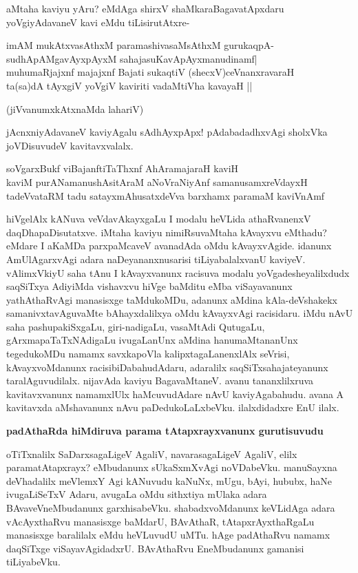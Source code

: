 \noindent
aMtaha kaviyu yAru? eMdAga shirxV shaMkaraBagavatApxdaru yoVgiyAdavaneV kavi eMdu tiLi\-sirutAtxre-

\begin{shloka}
imAM mukAtxvasAthxM paramashivasaMsAthxM gurukaqpA-\\\label{239}
sudhApAMgavAyxpAyxM sahajasuKavApAyxmanudinamf|\\
muhumaRjajxnf majajxnf Bajati sukaqtiV (shecxV)ceVnanxravaraH\\
ta(sa)dA tAyxgiV yoVgiV kaviriti vadaMtiVha kavayaH ||

\hfill{(jiVvanumxkAtxnaMda lahariV)}
\end{shloka}

\noindent
jAcnxniyAdavaneV kaviyAgalu sAdhAyxpApx! pAdabadadhxvAgi sholxVka joVDisuvudeV kavitavxvalalx.

\begin{shloka}
soVgarxBukf viBajanftiTaThxnf AhAramajaraH kaviH\\\label{239}
kaviM purANamanushAsitAraM aNoVraNiyAnf samanusamxreVdayxH\\
tadeVvataRM tadu satayxmAhusatxdeVva barxhamx paramaM kaviVnAmf\label{239}
\end{shloka}                    

hiVgelAlx kANuva veVdavAkayxgaLu I modalu heVLida athaRvanenxV daqDhapaDisutatxve. iMtaha kaviyu nimiRsuvaMtaha kAvayxvu eMthadu? eMdare I aKaMDa parxpaMcaveV avanadAda oMdu kAvayxvAgide. idanunx AmUlAgarxvAgi adara naDeyananxnusarisi tiLiyabalalxvanU kaviyeV. vAlimxVkiyU saha tAnu I kAvayxvanunx racisuva modalu yoVgadesheyalilxdudx saqSiTxya AdiyiMda vishavxvu hiVge baMditu eMba viSayavanunx yathAthaRvAgi manasisxge taMdukoMDu, adanunx aMdina kAla-deVshakekx samanivxtavAguvaMte bAhayxdalilxya oMdu kAvayxvAgi racisidaru. iMdu nAvU saha pashupakiSxgaLu, giri-nadigaLu, vasaMtAdi QutugaLu, gArxmapaTaTxNAdigaLu ivugaLanUnx aMdina hanumaMtananUnx tegedukoMDu namamx savxkapoVla kalipxtagaLanenxlAlx seVrisi, kAvayxvoMdanunx racisibiDabahudAdaru, adaralilx saqSiTxsahajateyanunx taralAguvu\-dilalx. nijavAda kaviyu BagavaMtaneV. avanu tananxlilxruva kavitavxvanunx namamxlUlx haMcuvudAdare nAvU kaviyAgabahudu. avana A kavitavxda aMshavanunx nAvu paDedukoLaLxbeVku. ilalxdidadxre EnU ilalx.

{\bigskip
\noindent
{\large\bf padAthaRda hiMdiruva parama tAtapxrayxvanunx gurutisuvudu}}\label{page240}
\medskip

\noindent
oTiTxnalilx SaDarxsagaLigeV AgaliV, navarasagaLigeV AgaliV, elilx paramatAtapxrayx? eMbudanunx sU\-kaSxmXvAgi noVDabeVku. manuSayxna deVhadalilx meVlemxY Agi kANuvudu kaNuNx, mUgu, bAyi, hububx, haNe ivugaLiSeTxV Adaru, avugaLa oMdu sithxtiya mUlaka adara BAvaveVneMbudanunx garxhisabeVku. shabadx\-voMdanunx keVLidAga adara vAcAyxthaRvu manasisxge baMdarU, BAvAthaR, tAtapxrAyxthaRgaLu manasisxge bara\-lilalx eMdu heVLuvudU uMTu. hAge padAthaRvu namamx daqSiTxge viSayavAgidadxrU. BAvA\-thaRvu EneMbudanunx gamanisi tiLiyabeVku.

